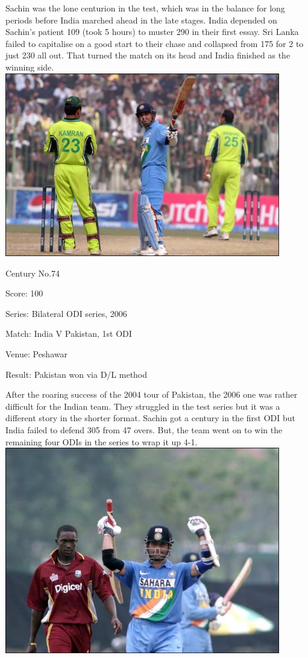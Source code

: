 \documentclass[11pt, a4paper]{article}
\begin{document}
Sachin was the lone centurion in the test, which was in the balance for long periods before India marched ahead in the late stages. India depended on Sachin's patient 109 (took 5 hours) to muster 290 in their first essay. Sri Lanka failed to capitalise on a good start to their chase and collapsed from 175 for 2 to just 230 all out. That turned the match on its head and India finished as the winning side.
\newpage
\includegraphics[width=0.9\textwidth]{pics/74.jpg}

Century No.74 

Score: 100 

Series: Bilateral ODI series, 2006 

Match: India V Pakistan, 1st ODI 

Venue: Peshawar 

Result: Pakistan won via D/L method 

After the roaring success of the 2004 tour of Pakistan, the 2006 one was rather difficult for the Indian team. They struggled in the test series but it was a different story in the shorter format. Sachin got a century in the first ODI but India failed to defend 305 from 47 overs. But, the team went on to win the remaining four ODIs in the series to wrap it up 4-1.
\newpage
\includegraphics[width=0.9\textwidth]{pics/75.jpg}
\end{document}
